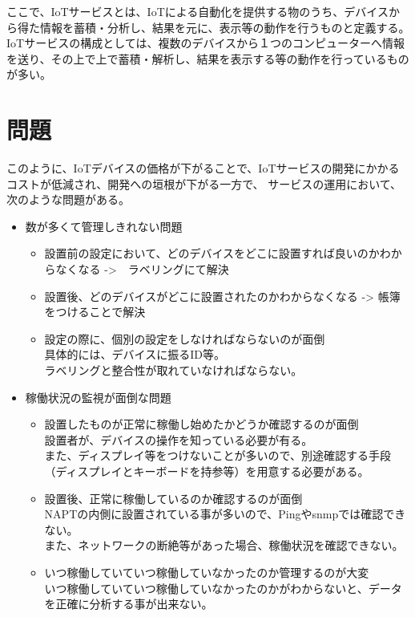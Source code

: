 ここで、IoTサービスとは、IoTによる自動化を提供する物のうち、デバイスから得た情報を蓄積・分析し、結果を元に、表示等の動作を行うものと定義する。
IoTサービスの構成としては、複数のデバイスから１つのコンピューターへ情報を送り、その上で上で蓄積・解析し、結果を表示する等の動作を行っているものが多い。

\section{問題}
このように、IoTデバイスの価格が下がることで、IoTサービスの開発にかかるコストが低減され、開発への垣根が下がる一方で、
サービスの運用において、次のような問題がある。
\begin{itemize}
	\item 数が多くて管理しきれない問題
	\begin{itemize}
		\item 設置前の設定において、どのデバイスをどこに設置すれば良いのかわからなくなる ->　ラベリングにて解決
		\item 設置後、どのデバイスがどこに設置されたのかわからなくなる -> 帳簿をつけることで解決
		\item 設定の際に、個別の設定をしなければならないのが面倒\\
			具体的には、デバイスに振るID等。\\
			ラベリングと整合性が取れていなければならない。
	\end{itemize}
	\item 稼働状況の監視が面倒な問題
	\begin{itemize}
		\item 設置したものが正常に稼働し始めたかどうか確認するのが面倒\\
			設置者が、デバイスの操作を知っている必要が有る。\\
			また、ディスプレイ等をつけないことが多いので、別途確認する手段（ディスプレイとキーボードを持参等）を用意する必要がある。
		\item 設置後、正常に稼働しているのか確認するのが面倒\\
			NAPTの内側に設置されている事が多いので、Pingやsnmpでは確認できない。\\
			また、ネットワークの断絶等があった場合、稼働状況を確認できない。
		\item いつ稼働していていつ稼働していなかったのか管理するのが大変\\
			いつ稼働していていつ稼働していなかったのかがわからないと、データを正確に分析する事が出来ない。
	\end{itemize}
\end{itemize}

